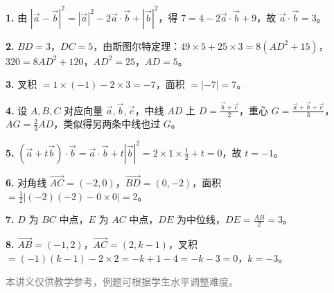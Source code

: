 \documentclass[12pt, a4paper]{ctexart}
\begin{document}
\vspace{10pt}
\begin{knowledgebox}[参考答案]
\textbf{1.} 由 $|\vec{a}-\vec{b}|^2 = |\vec{a}|^2 - 2\vec{a}\cdot\vec{b} + |\vec{b}|^2$，得 $7 = 4 - 2\vec{a}\cdot\vec{b} + 9$，故 $\vec{a}\cdot\vec{b} = 3$。

\textbf{2.} $BD=3$，$DC=5$，由斯图尔特定理：$49 \times 5 + 25 \times 3 = 8(AD^2 + 15)$，$320 = 8AD^2 + 120$，$AD^2 = 25$，$AD = 5$。

\textbf{3.} 叉积 $= 1 \times (-1) - 2 \times 3 = -7$，面积 $= |{-7}| = 7$。

\textbf{4.} 设 $A, B, C$ 对应向量 $\vec{a}, \vec{b}, \vec{c}$，中线 $AD$ 上 $D = \frac{\vec{b}+\vec{c}}{2}$，重心 $G = \frac{\vec{a}+\vec{b}+\vec{c}}{3}$，$AG = \frac{2}{3}AD$，类似得另两条中线也过 $G$。

\textbf{5.} $(\vec{a}+t\vec{b})\cdot\vec{b} = \vec{a}\cdot\vec{b} + t|\vec{b}|^2 = 2 \times 1 \times \frac{1}{2} + t = 0$，故 $t = -1$。

\textbf{6.} 对角线 $\vec{AC}=(-2,0)$，$\vec{BD}=(0,-2)$，面积 $= \frac{1}{2}|(-2)(-2)-0 \times 0| = 2$。

\textbf{7.} $D$ 为 $BC$ 中点，$E$ 为 $AC$ 中点，$DE$ 为中位线，$DE = \frac{AB}{2} = 3$。

\textbf{8.} $\overrightarrow{AB}=(-1,2)$，$\overrightarrow{AC}=(2,k-1)$，叉积 $=(-1)(k-1)-2 \times 2 = -k+1-4 = -k-3 = 0$，$k=-3$。
\end{knowledgebox}

\vfill
\begin{center}
\small\textcolor{gray}{本讲义仅供教学参考，例题可根据学生水平调整难度。}
\end{center}
\end{document}
